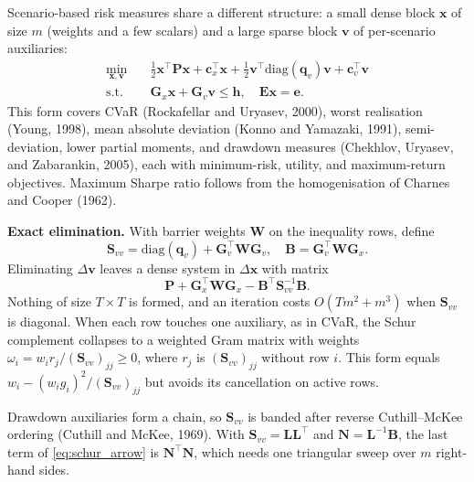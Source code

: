 \documentclass[10pt,twocolumn,letterpaper]{article}
\begin{document}
Scenario-based risk measures share a different structure: a small dense block $\mathbf{x}$ of size $m$ (weights and a few scalars) and a large sparse block $\mathbf{v}$ of per-scenario auxiliaries:
\begin{align}
\min_{\mathbf{x},\mathbf{v}} \quad & \frac{1}{2}\mathbf{x}^\top \mathbf{P}\mathbf{x} + \mathbf{c}_x^\top \mathbf{x} + \frac{1}{2}\mathbf{v}^\top \mathrm{diag}(\mathbf{q}_v)\mathbf{v} + \mathbf{c}_v^\top \mathbf{v} \nonumber\\
\text{s.t.} \quad & \mathbf{G}_x\mathbf{x} + \mathbf{G}_v\mathbf{v} \le \mathbf{h}, \quad \mathbf{E}\mathbf{x} = \mathbf{e}. \label{eq:arrow}
\end{align}
This form covers CVaR (Rockafellar and Uryasev, 2000), worst realisation (Young, 1998), mean absolute deviation (Konno and Yamazaki, 1991), semi-deviation, lower partial moments, and drawdown measures (Chekhlov, Uryasev, and Zabarankin, 2005), each with minimum-risk, utility, and maximum-return objectives. Maximum Sharpe ratio follows from the homogenisation of Charnes and Cooper (1962).

\textbf{Exact elimination.} With barrier weights $\mathbf{W}$ on the inequality rows, define
\begin{equation}
\mathbf{S}_{vv} = \mathrm{diag}(\mathbf{q}_v) + \mathbf{G}_v^\top \mathbf{W}\mathbf{G}_v, \quad \mathbf{B} = \mathbf{G}_v^\top \mathbf{W}\mathbf{G}_x. \label{eq:svv}
\end{equation}
Eliminating $\Delta\mathbf{v}$ leaves a dense system in $\Delta\mathbf{x}$ with matrix
\begin{equation}
\mathbf{P} + \mathbf{G}_x^\top \mathbf{W}\mathbf{G}_x - \mathbf{B}^\top \mathbf{S}_{vv}^{-1}\mathbf{B}. \label{eq:schur_arrow}
\end{equation}
Nothing of size $T \times T$ is formed, and an iteration costs $O(Tm^2 + m^3)$ when $\mathbf{S}_{vv}$ is diagonal. When each row touches one auxiliary, as in CVaR, the Schur complement collapses to a weighted Gram matrix with weights $\omega_i = w_i r_j / (\mathbf{S}_{vv})_{jj} \ge 0$, where $r_j$ is $(\mathbf{S}_{vv})_{jj}$ without row $i$. This form equals $w_i - (w_i g_i)^2 / (\mathbf{S}_{vv})_{jj}$ but avoids its cancellation on active rows.

Drawdown auxiliaries form a chain, so $\mathbf{S}_{vv}$ is banded after reverse Cuthill--McKee ordering (Cuthill and McKee, 1969). With $\mathbf{S}_{vv} = \mathbf{L}\mathbf{L}^\top$ and $\mathbf{N} = \mathbf{L}^{-1}\mathbf{B}$, the last term of \eqref{eq:schur_arrow} is $\mathbf{N}^\top\mathbf{N}$, which needs one triangular sweep over $m$ right-hand sides.
\end{document}
